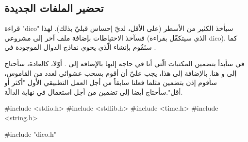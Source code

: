 \subsection{تحضير الملفات الجديدة}

قراءة
"\textenglish{dico}"
سيأخذ الكثير من الأسطر (على الأقل، لديّ إحساس قبليّ بذلك). لهذا فسآخذ الاحتياطات بإضافة ملف آخر إلى مشروعي
(الذي سيتكفّل بقراءة
\textenglish{dico}).
كما سنَقُوم بإنشاء
الّذي يحوي نماذج الدوال الموجودة في
.

في
سأبدأ بتضمين  المكتبات الّتي أنا في حاجة إليها بالإضافة إلى
.
أوّلا، كالعادة، سأحتاج إلى
و
هنا. بالإضافة إلى هذا، يجب عليّ أن أقوم بسحب عشوائي لعدد من القاموس، سأقوم إذن بتضمين
مثلما فعلنا سابقاً من أجل العمل التطبيقي الأول "أكثر أو أقل".سأحتاج أيضا إلى تضمين
من أجل استعمال
في نهاية الدالّة.

\begin{Csource}
#include <stdio.h>
#include <stdlib.h>
#include <time.h>
#include <string.h>

#include "dico.h"
\end{Csource}
